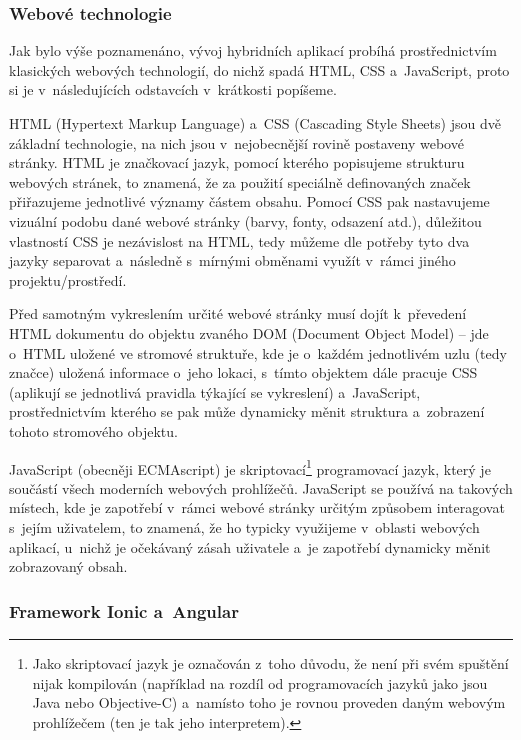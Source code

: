\hypertarget{webovuxe9-technologie}{%
\subsubsection{Webové technologie}\label{webovuxe9-technologie}}

Jak bylo výše poznamenáno, vývoj hybridních aplikací probíhá
prostřednictvím klasických webových technologií, do nichž spadá HTML,
CSS a~JavaScript, proto si je v~následujících odstavcích v~krátkosti
popíšeme.

HTML (Hypertext Markup Language) a~CSS (Cascading Style Sheets) jsou dvě
základní technologie, na nich jsou v~nejobecnější rovině postaveny
webové stránky. HTML je značkovací jazyk, pomocí kterého popisujeme
strukturu webových stránek, to znamená, že za použití speciálně
definovaných značek přiřazujeme jednotlivé významy částem obsahu. Pomocí
CSS pak nastavujeme vizuální podobu dané webové stránky (barvy, fonty,
odsazení atd.), důležitou vlastností CSS je nezávislost na HTML, tedy
můžeme dle potřeby tyto dva jazyky separovat a~následně s~mírnými
obměnami využít v~rámci jiného projektu/prostředí.~\parencite{htmlcss}

Před samotným vykreslením určité webové stránky musí dojít k~převedení
HTML dokumentu do objektu zvaného DOM (Document Object Model) -- jde
o~HTML uložené ve stromové struktuře, kde je o~každém jednotlivém uzlu
(tedy značce) uložená informace o~jeho lokaci, s~tímto objektem dále
pracuje CSS (aplikují se jednotlivá pravidla týkající se vykreslení)
a~JavaScript, prostřednictvím kterého se pak může dynamicky měnit
struktura a~zobrazení tohoto stromového objektu.
\parencite{howbrowserswork}

JavaScript (obecněji ECMAscript) je
skriptovací\footnote{Jako skriptovací jazyk je označován z~toho důvodu, že není při svém spuštění nijak kompilován (například na rozdíl od programovacích jazyků jako jsou Java nebo Objective-C) a~namísto toho je rovnou proveden daným webovým prohlížečem (ten je tak jeho interpretem).}
programovací jazyk, který je součástí všech moderních webových
prohlížečů. JavaScript se používá na takových místech, kde je zapotřebí
v~rámci webové stránky určitým způsobem interagovat s~jejím uživatelem,
to znamená, že ho typicky využijeme v~oblasti webových aplikací, u~nichž
je očekávaný zásah uživatele a~je zapotřebí dynamicky měnit zobrazovaný
obsah.~\parencite{javascript}

\hypertarget{framework-ionic-a-angular}{%
\subsubsection{Framework Ionic a~Angular}\label{framework-ionic-a-angular}}

